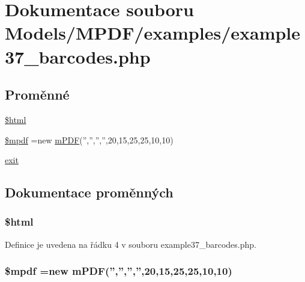\hypertarget{example37__barcodes_8php}{\section{Dokumentace souboru Models/\-M\-P\-D\-F/examples/example37\-\_\-barcodes.php}
\label{example37__barcodes_8php}
}
\subsection*{Proměnné}
\begin{DoxyCompactItemize}
\item 
\hyperlink{example37__barcodes_8php_a6f96e7fc92441776c9d1cd3386663b40}{\$html}
\item 
\hyperlink{example37__barcodes_8php_ad028f81910d6cbab9b184d2214b3a8f8}{\$mpdf} =new \hyperlink{classm_p_d_f}{m\-P\-D\-F}('','','','',20,15,25,25,10,10)
\item 
\hyperlink{example37__barcodes_8php_a6733eb5f605d09eaede9845835d71c4e}{exit}
\end{DoxyCompactItemize}


\subsection{Dokumentace proměnných}
\hypertarget{example37__barcodes_8php_a6f96e7fc92441776c9d1cd3386663b40}{
\subsubsection[{\$html}]{\setlength{\rightskip}{0pt plus 5cm}\$html}}\label{example37__barcodes_8php_a6f96e7fc92441776c9d1cd3386663b40}


Definice je uvedena na řádku 4 v souboru example37\-\_\-barcodes.\-php.

\hypertarget{example37__barcodes_8php_ad028f81910d6cbab9b184d2214b3a8f8}{
\subsubsection[{\$mpdf}]{\setlength{\rightskip}{0pt plus 5cm}\$mpdf =new {\bf m\-P\-D\-F}('','','','',20,15,25,25,10,10)}}\label{example37__barcodes_8php_ad028f81910d6cbab9b184d2214b3a8f8}


